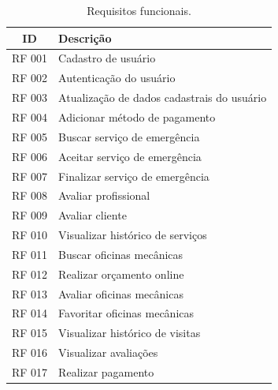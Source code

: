 \begin{table}[!ht]
  \begin{center}
    \caption{Requisitos funcionais.}
    \label{tab:table2}
    \begin{tabular}{|c|l|} 
      \hline
      \textbf{ID} & \textbf{Descrição}\\
      \hline
      RF 001 & Cadastro de usuário \\
      \hline
      RF 002 & Autenticação do usuário \\
      \hline
      RF 003 & Atualização de dados cadastrais do usuário \\
      \hline
      RF 004 & Adicionar método de pagamento \\
      \hline
      RF 005 & Buscar serviço de emergência \\
      \hline
      RF 006 & Aceitar serviço de emergência \\
      \hline
      RF 007 & Finalizar serviço de emergência\\
      \hline
      RF 008 & Avaliar profissional \\
      \hline
      RF 009 & Avaliar cliente \\
      \hline
      RF 010 & Visualizar histórico de serviços \\
      \hline
      RF 011 & Buscar oficinas mecânicas \\
      \hline
      RF 012 & Realizar orçamento online \\
      \hline
      RF 013 & Avaliar oficinas mecânicas \\
      \hline
      RF 014 & Favoritar oficinas mecânicas \\
      \hline
      RF 015 & Visualizar histórico de visitas \\
      \hline
      RF 016 & Visualizar avaliações \\
      \hline
      RF 017 & Realizar pagamento \\
      \hline
    \end{tabular}
  \end{center}
\end{table}

